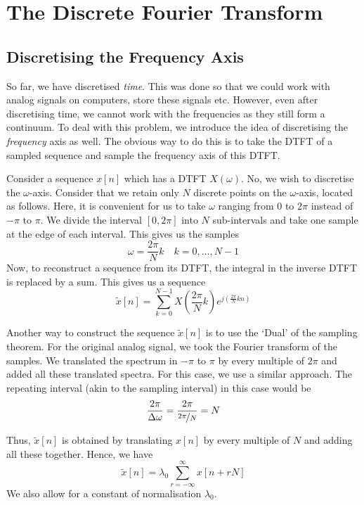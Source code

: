 \documentclass{article}
\theoremstyle{definition}
\begin{document}
\section{The Discrete Fourier Transform}

\subsection{Discretising the Frequency Axis}

So far, we have discretised \textit{time}. This was done so that we could work with analog signals on computers, store these signals etc. However, even after discretising time, we cannot work with the frequencies as they still form a continuum. To deal with this problem, we introduce the idea of discretising the \textit{frequency} axis as well. The obvious way to do this is to take the DTFT of a sampled sequence and sample the frequency axis of this DTFT. \medskip

Consider a sequence $x[n]$ which has a DTFT $X(\omega)$. No, we wish to discretise the $\omega$-axis. Consider that we retain only $N$ discrete points on the $\omega$-axis, located as follows. Here, it is convenient for us to take $\omega$ ranging from $0$ to $2\pi$ instead of $-\pi$ to $\pi$. We divide the interval $[0,2\pi]$ into $N$ sub-intervals and take one sample at the edge of each interval. This gives us the samples
\[
    \omega = \frac{2\pi}{N} k \quad k = 0, \ldots , N-1
\]
Now, to reconstruct a sequence from its DTFT, the integral in the inverse DTFT is replaced by a sum. This gives us a sequence 
\[
    \widetilde{x}[n] = \sum_{k=0}^{N-1} X\left( \frac{2\pi}{N}k \right) e^{j \left( \frac{2\pi}{N}kn \right)}
\]

Another way to construct the sequence $\widetilde{x}[n]$ is to use the `Dual' of the sampling theorem. For the original analog signal, we took the Fourier transform of the samples. We translated the spectrum in $-\pi$ to $\pi$ by every multiple of $2\pi$ and added all these translated spectra. For this case, we use a similar approach. The repeating interval (akin to the sampling interval) in this case would be 
\[
    \frac{2\pi}{\Delta\omega} = \frac{2\pi}{\nicefrac{2\pi}{N}} = N
\]


Thus, $\widetilde{x}[n]$ is obtained by translating $x[n]$ by every multiple of $N$ and adding all these together. Hence, we have 
\[
    \widetilde{x}[n] = \lambda_0 \sum_{r= -\infty}^{\infty} x[n + rN]
\]
We also allow for a constant of normalisation $\lambda_0$. 
\end{document}
